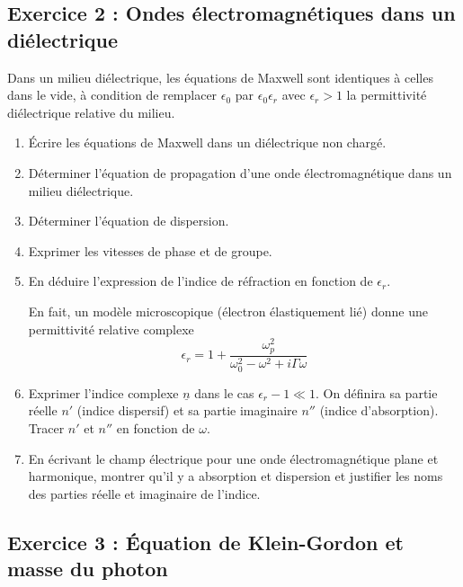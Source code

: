 \subsection{Exercice 2 : Ondes électromagnétiques dans un diélectrique}

Dans un milieu diélectrique, les équations de Maxwell sont identiques à celles dans le vide, à condition de remplacer $\epsilon_0$ par $\epsilon_0 \epsilon_r$ avec $\epsilon_r > 1$ la permittivité diélectrique relative du milieu.

\begin{enumerate}
	\item Écrire les équations de Maxwell dans un diélectrique non chargé.
	\item Déterminer l'équation de propagation d'une onde électromagnétique dans un milieu diélectrique.
	\item Déterminer l'équation de dispersion.
	\item Exprimer les vitesses de phase et de groupe. 
	\item En déduire l'expression de l'indice de réfraction en fonction de $\epsilon_r$.
	
	En fait, un modèle microscopique (électron élastiquement lié) donne une permittivité relative complexe $$\epsilon_r = 1 + \frac{\omega_p^2}{\omega_0^2 - \omega^2 + i \Gamma \omega}$$
	
	\item Exprimer l'indice complexe $\underline{n}$ dans le cas $\epsilon_r-1 \ll 1$. On définira sa partie réelle $n'$ (indice dispersif) et sa partie imaginaire $n''$ (indice d'absorption). Tracer $n'$ et $n''$ en fonction de $\omega$.
	\item En écrivant le champ électrique pour une onde électromagnétique plane et harmonique, montrer qu'il y a absorption et dispersion et justifier les noms des parties réelle et imaginaire de l'indice.
\end{enumerate}

\subsection{Exercice 3 : Équation de Klein-Gordon et masse du photon}

